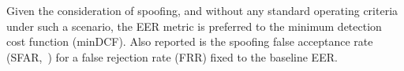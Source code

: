 Given the consideration of spoofing, and without any standard operating criteria under such a scenario, the EER metric is preferred to the minimum detection cost function (minDCF).  Also reported is the spoofing false acceptance rate (SFAR,~\cite{Johnson2010}) for a false rejection rate (FRR) fixed to the baseline EER.
